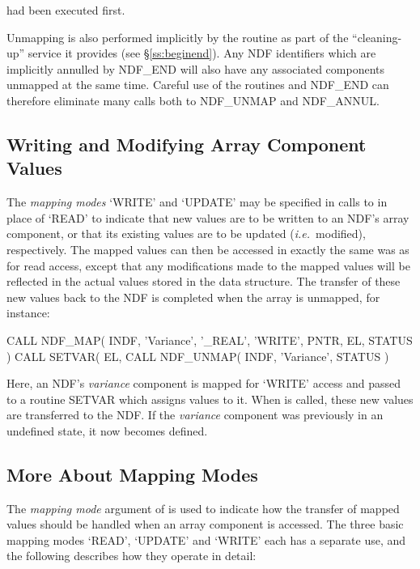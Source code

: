 \documentclass[twoside,11pt,nolof]{starlink}
\providecommand{\st}[1]{{\emph{#1}}}
\begin{document}
had been executed first.

Unmapping is also performed implicitly by the routine  as part of
the ``cleaning-up'' service it provides (see \S\ref{ss:beginend}).
Any NDF identifiers which are implicitly annulled by NDF\_END will also have
any associated components unmapped at the same time.
Careful use of the routines  and NDF\_END can therefore eliminate many
calls  both to NDF\_UNMAP and NDF\_ANNUL.

\subsection{\label{ss:writingandmodifying}Writing and Modifying Array Component Values}

The \st{mapping modes\/} `WRITE' and `UPDATE' may be specified in calls to
 in place of `READ' to indicate that new values are to be written to
an NDF's array component, or that its existing values are to be updated
(\st{i.e.}\ modified), respectively.
The mapped values can then be accessed in exactly the same was as for read
access, except that any modifications made to the mapped values will be
reflected in the actual values stored in the data structure.
The transfer of these new values back to the NDF is completed when the
array is unmapped, for instance:

\small
\begin{terminalv}
      CALL NDF_MAP( INDF, 'Variance', '_REAL', 'WRITE', PNTR, EL, STATUS )
      CALL SETVAR( EL, %
      CALL NDF_UNMAP( INDF, 'Variance', STATUS )
\end{terminalv}
\normalsize

Here, an NDF's \st{variance\/} component is mapped for `WRITE' access and
passed to a routine SETVAR which assigns values to it.
When  is called, these new values are transferred to the NDF.
If the \st{variance\/} component was previously in an undefined state, it now
becomes defined.

\subsection{\label{ss:moreaboutmapping}More About Mapping Modes}

The \st{mapping mode\/} argument of  is used to
indicate how the transfer of mapped values should be handled when an array
component is accessed.
The three basic mapping modes `READ', `UPDATE' and `WRITE' each has a
separate use, and the following describes how they operate in detail:
\end{document}
